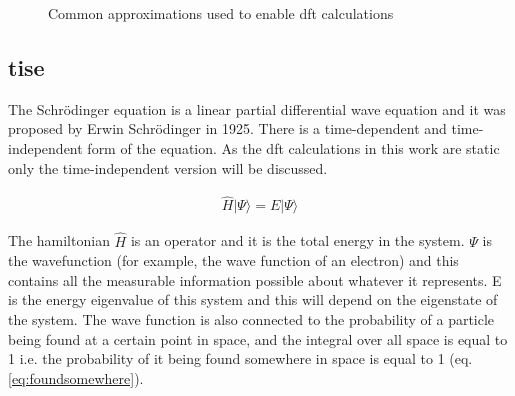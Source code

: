 \begin{figure}[!h]
\caption{Common approximations used to enable \acrshort{dft} calculations}
\label{fig:dftapproximations}
\end{figure}









\subsection{\acrlong{tise}}

The Schr\"{o}dinger equation is a linear partial differential wave equation and it was proposed by Erwin Schr\"{o}dinger in 1925.  There is a time-dependent and time-independent form of the equation.  As the \acrshort{dft} calculations in this work are static only the time-independent version will be discussed.  

\begin{equation}
\begin{split}
\hat{H} \lvert \Psi \rangle = E \lvert \Psi \rangle
\end{split}
\label{eq:eqTimeIndependentSchrodinger}
\end{equation}

The \Gls{hamiltonian} $\hat{H}$ is an operator and it is the total energy in the system.  $\Psi$ is the \gls{wavefunction} (for example, the wave function of an electron) and this contains all the measurable information possible about whatever it represents.  E is the energy eigenvalue of this system and this will depend on the eigenstate of the system.  The wave function is also connected to the probability of a particle being found at a certain point in space, and the integral over all space is equal to 1 i.e. the probability of it being found somewhere in space is equal to 1 (eq. \ref{eq:foundsomewhere}).

